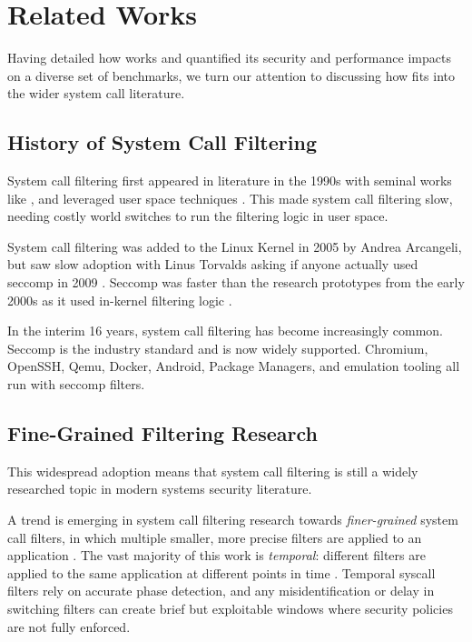 \section{Related Works}\label{sec:related-works}

Having detailed how \af works and quantified its security and performance
impacts on a diverse set of benchmarks, we turn our attention to discussing how
\af fits into the wider system call literature.

\subsection{History of System Call Filtering}

System call filtering first appeared in literature in the 1990s with seminal
works like \textcite{wagner1999janus}, and leveraged
user space techniques \cite{somayaji2000automated, garfinkel2004ostia}. This made
system call filtering slow, needing costly world switches to run the filtering
logic in user space.

System call filtering was added to the Linux Kernel in 2005 by Andrea Arcangeli, but
saw slow adoption with Linus Torvalds asking if anyone actually used seccomp in
2009 \cite{arcangeli_seccomp_2005, TORVALDS_ANYONE_USES_SECCOMP}. Seccomp was
faster than the research prototypes from the early 2000s as it used in-kernel
filtering logic \cite{jia2023programmablesecurityebpf}.

In the interim 16 years, system call filtering has become increasingly common.
Seccomp is the industry standard and is now widely supported. Chromium, OpenSSH,
Qemu, Docker, Android, Package Managers, and emulation tooling all run with
seccomp filters.

\subsection{Fine-Grained Filtering Research}

This widespread adoption means that system call filtering is still a widely
researched topic in modern systems security literature. 

A trend is emerging in system call filtering research towards 
\textit{finer-grained} system call filters, in which multiple smaller, more
precise filters are applied to an application 
\cite{SYSPART, SYSXCHG, ahad2023freepart}. The vast majority of this work is
\textit{temporal}: different filters are applied to the same application at
different points in time \cite{SYSPART, TEMPORAL_SPEC}. Temporal syscall
filters rely on accurate phase detection, and any misidentification or delay
in switching filters can create brief but exploitable windows where security
policies are not fully enforced. 

